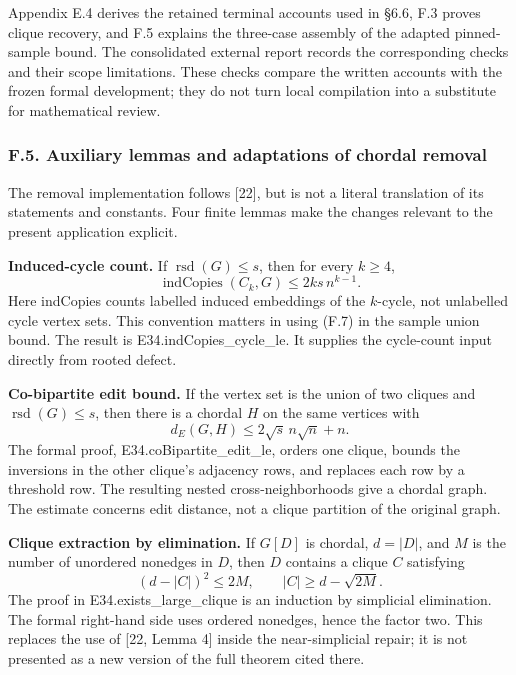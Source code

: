 \documentclass[english,11pt,a4paper]{article}
\newcounter{none}
\begin{document}
Appendix E.4 derives the retained terminal accounts used in §6.6, F.3 proves clique recovery, and F.5 explains the three-case assembly of the adapted pinned-sample bound. The consolidated external report records the corresponding checks and their scope limitations. These checks compare the written accounts with the frozen formal development; they do not turn local compilation into a substitute for mathematical review.

\subsubsection{F.5. Auxiliary lemmas and adaptations of chordal removal}\label{f.5.-auxiliary-lemmas-and-adaptations-of-chordal-removal}

The removal implementation follows {[}22{]}, but is not a literal translation of its statements and constants. Four finite lemmas make the changes relevant to the present application explicit.

\textbf{Induced-cycle count.} If \(\operatorname{rsd}(G)\le s\), then for every \(k\ge4\), \[
\operatorname{indCopies}(C_k,G)\le2ks\,n^{k-1}.
\tag{F.7}
\] Here indCopies counts labelled induced embeddings of the \(k\)-cycle, not unlabelled cycle vertex sets. This convention matters in using (F.7) in the sample union bound. The result is {\ttfamily\small E34.\discretionary{\hbox{\ensuremath{\hookrightarrow}}}{}{}indCopies\_\discretionary{\hbox{\ensuremath{\hookrightarrow}}}{}{}cycle\_\discretionary{\hbox{\ensuremath{\hookrightarrow}}}{}{}le}. It supplies the cycle-count input directly from rooted defect.

\textbf{Co-bipartite edit bound.} If the vertex set is the union of two cliques and \(\operatorname{rsd}(G)\le s\), then there is a chordal \(H\) on the same vertices with \[
d_E(G,H)\le2\sqrt{s}\,n\sqrt n+n.
\tag{F.8}
\] The formal proof, {\ttfamily\small E34.\discretionary{\hbox{\ensuremath{\hookrightarrow}}}{}{}coBipartite\_\discretionary{\hbox{\ensuremath{\hookrightarrow}}}{}{}edit\_\discretionary{\hbox{\ensuremath{\hookrightarrow}}}{}{}le}, orders one clique, bounds the inversions in the other clique's adjacency rows, and replaces each row by a threshold row. The resulting nested cross-neighborhoods give a chordal graph. The estimate concerns edit distance, not a clique partition of the original graph.

\textbf{Clique extraction by elimination.} If \(G[D]\) is chordal, \(d=|D|\), and \(M\) is the number of unordered nonedges in \(D\), then \(D\) contains a clique \(C\) satisfying \[
(d-|C|)^2\le2M,\qquad |C|\ge d-\sqrt{2M}.
\tag{F.9}
\] The proof in {\ttfamily\small E34.\discretionary{\hbox{\ensuremath{\hookrightarrow}}}{}{}exists\_\discretionary{\hbox{\ensuremath{\hookrightarrow}}}{}{}large\_\discretionary{\hbox{\ensuremath{\hookrightarrow}}}{}{}clique} is an induction by simplicial elimination. The formal right-hand side uses ordered nonedges, hence the factor two. This replaces the use of {[}22, Lemma 4{]} inside the near-simplicial repair; it is not presented as a new version of the full theorem cited there.
\end{document}
